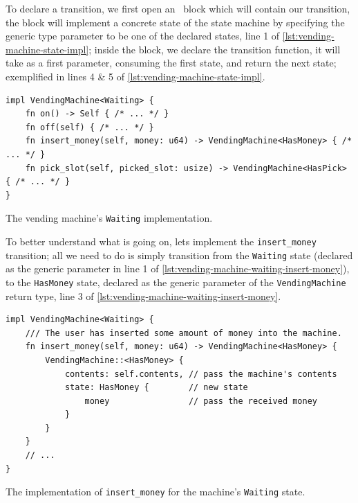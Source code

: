 To declare a transition, we first open an \footnotemark~block which will contain our transition,
the block will implement a concrete state of the state machine by specifying the generic type parameter to be one of the declared states, line 1 of \autoref{lst:vending-machine-state-impl};
inside the block, we declare the transition function, it will take  as a first parameter, consuming the first state, and return the next state;
exemplified in lines 4 \& 5 of \autoref{lst:vending-machine-state-impl}.

\begin{listing}
    \begin{verbatim}
impl VendingMachine<Waiting> {
    fn on() -> Self { /* ... */ }
    fn off(self) { /* ... */ }
    fn insert_money(self, money: u64) -> VendingMachine<HasMoney> { /* ... */ }
    fn pick_slot(self, picked_slot: usize) -> VendingMachine<HasPick> { /* ... */ }
}
\end{verbatim}
    \caption[test]{The vending machine's \texttt{Waiting} implementation\footnotemark.} %
    \label{lst:vending-machine-state-impl}
\end{listing}

To better understand what is going on, lets implement the \texttt{insert\_money} transition;
all we need to do is simply transition from the \texttt{Waiting} state (declared as the generic parameter in line 1 of \autoref{lst:vending-machine-waiting-insert-money}),
to the \texttt{HasMoney} state, declared as the generic parameter of the \texttt{VendingMachine} return type, line 3 of \autoref{lst:vending-machine-waiting-insert-money}.

\begin{listing}
    \begin{verbatim}
impl VendingMachine<Waiting> {
    /// The user has inserted some amount of money into the machine.
    fn insert_money(self, money: u64) -> VendingMachine<HasMoney> {
        VendingMachine::<HasMoney> {
            contents: self.contents, // pass the machine's contents
            state: HasMoney {        // new state
                money                // pass the received money
            }
        }
    }
    // ...
}
\end{verbatim}
    \caption{The implementation of \texttt{insert\_money} for the machine's \texttt{Waiting} state.}
    \label{lst:vending-machine-waiting-insert-money}
\end{listing}

